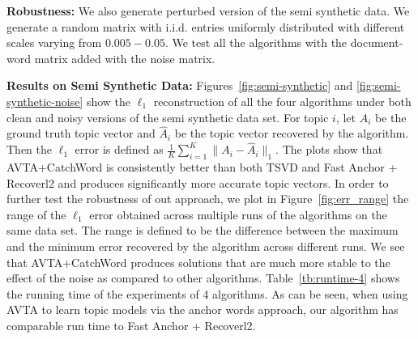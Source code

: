 \documentclass[]{article}
\begin{document}
	
	\noindent \textbf{Robustness:} We also generate perturbed version of the semi synthetic data. We generate a random matrix with i.i.d. entries uniformly distributed with different scales varying from $0.005-0.05$. We test all the algorithms with the document-word matrix added with the noise matrix.

	
	\noindent \textbf{Results on Semi Synthetic Data:}
	Figures~\ref{fig:semi-synthetic} and \ref{fig:semi-synthetic-noise} show the $\ell_1$ reconstruction of all the four algorithms under both clean and noisy versions of the semi synthetic data set. For topic $i$, let $A_i$ be the ground truth topic vector and $\hat{A}_i$ be the topic vector recovered by the algorithm. Then the $\ell_1$ error is defined as $\frac 1 K \sum_{i=1}^K \|A_i - \hat{A}_i\|_1$. The plots show that AVTA+CatchWord is consistently better than both TSVD and Fast Anchor + Recoverl2 and produces significantly more accurate topic vectors. In order to further test the robustness of out approach, we plot in Figure~\ref{fig:err_range} the range of the $\ell_1$ error obtained across multiple runs of the algorithms on the same data set. The range is defined to be the difference between the maximum and the minimum error recovered by the algorithm across different runs. We see that AVTA+CatchWord produces solutions that are much more stable to the effect of the noise as compared to other algorithms. Table~\ref{tb:runtime-4} shows the running time of the experiments of 4 algorithms. As can be seen, when using AVTA to learn topic models via the anchor words approach, our algorithm has comparable run time to Fast Anchor + Recoverl2. 
\end{document}
